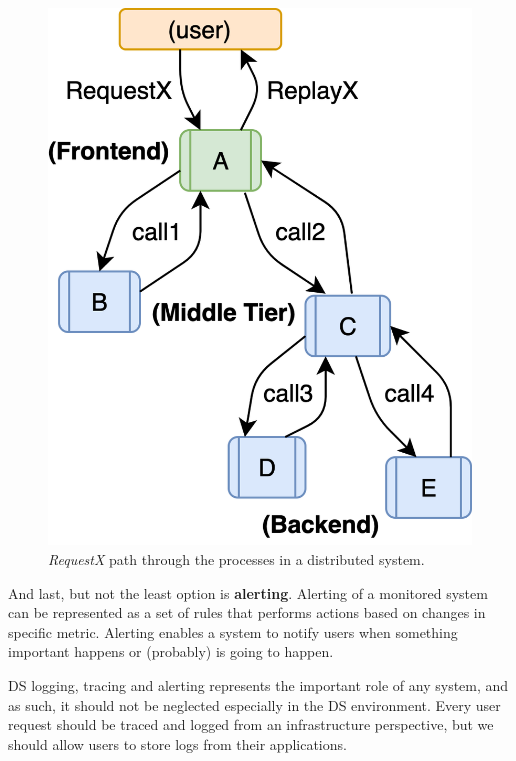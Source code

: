 \begin{figure}[H]
	\begin{center}
		\includegraphics[scale=0.8]{images/Figure18}
	\end{center}
	\vspace{-0.75cm}
	\caption{\textit{RequestX} path through the processes in a distributed system.}
	\label{fig:fig18}
\end{figure}

\noindent
And last, but not the least option is \textbf{alerting}. Alerting of a monitored system can be represented as a set of rules that performs actions based on changes in specific metric. Alerting enables a system to notify users when something important happens or (probably) is going to happen.

DS logging, tracing and alerting represents the important role of any system, and as such, it should not be neglected especially in the DS environment. Every user request should be traced and logged from an infrastructure perspective, but we should allow users to store logs from their applications.
%
%
